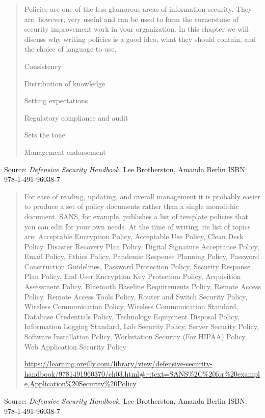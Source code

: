 \documentclass[Screen16to9,17pt]{foils}
\begin{document}
\begin{quote}
Policies are one of the less glamorous areas of information security. They are, however, very useful and can be used to form the cornerstone of security improvement work in your organization. In this chapter we will discuss why writing policies is a good idea, what they should contain, and the choice of language to use.
\begin{list2}
\item Consistency
\item Distribution of knowledge
\item Setting expectations
\item Regulatory compliance and audit
\item Sets the tone
\item Management endorsement
\end{list2}
\end{quote}
Source: \emph{Defensive Security Handbook}, Lee Brotherston, Amanda Berlin ISBN: 978-1-491-96038-7





\begin{quote}
For ease of reading, updating, and overall management it is probably easier to produce a set of policy documents rather than a single monolithic document.
SANS, for example, publishes a list of template policies that you can edit for your own needs. At the time of writing, its list of topics are: {\small
Acceptable Encryption Policy,
Acceptable Use Policy,
Clean Desk Policy,
Disaster Recovery Plan Policy,
Digital Signature Acceptance Policy,
Email Policy,
Ethics Policy,
Pandemic Response Planning Policy,
Password Construction Guidelines,
Password Protection Policy,
Security Response Plan Policy,
End User Encryption Key Protection Policy,
Acquisition Assessment Policy,
Bluetooth Baseline Requirements Policy,
Remote Access Policy,
Remote Access Tools Policy,
Router and Switch Security Policy,
Wireless Communication Policy,
Wireless Communication Standard,
Database Credentials Policy,
Technology Equipment Disposal Policy,
Information Logging Standard,
Lab Security Policy,
Server Security Policy,
Software Installation Policy,
Workstation Security (For HIPAA) Policy,
Web Application Security Policy}

{\scriptsize\url{https://learning.oreilly.com/library/view/defensive-security-handbook/9781491960370/ch03.html#:-:text=SANS%2C%20for%20example,Application%20Security%20Policy}}
\end{quote}
Source: \emph{Defensive Security Handbook}, Lee Brotherston, Amanda Berlin ISBN: 978-1-491-96038-7
\end{document}
